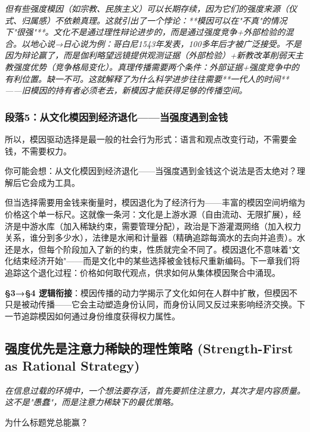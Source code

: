 \documentclass[a4paper,12pt]{book}
\newenvironment{motivation}{\begin{tcolorbox}[colback=gray!10,colframe=gray!60,title=\textit{动机}]\small\itshape}{\end{tcolorbox}}
\newenvironment{questionbox}{\begin{tcolorbox}[colback=red!3,colframe=red!60]}{\end{tcolorbox}}
\begin{document}
\begin{motivation}
\begin{motivation}
\begin{motivation}
但有些强度模因（如宗教、民族主义）可以长期存续，因为它们的强度来源（仪式、归属感）不依赖真理。这就引出了一个悖论：**模因可以在"不真"的情况下"很强"**。文化不是通过理性辩论进步的，而是通过强度竞争+外部检验的混合。以地心说→日心说为例：哥白尼1543年发表，100多年后才被广泛接受。不是因为辩论赢了，而是伽利略望远镜提供观测证据（外部检验）+新教改革削弱天主教强度优势（竞争格局变化）。真理传播需要两个条件：外部证据+强度竞争中的有利位置。缺一不可。这就解释了为什么科学进步往往需要**一代人的时间**——旧模因的持有者必须老去，新模因才能获得足够的传播空间。

	\subsubsection*{段落5：从文化模因到经济退化——当强度遇到金钱}
	所以，模因驱动选择是最一般的社会行为形式：语言和观点改变行动，不需要金钱，不需要权力。
	\begin{tcolorbox}[colback=yellow!5, title=\textit{读者行为预测}]
		你可能会想：从文化模因到经济退化——当强度遇到金钱这个说法是否太绝对？理解后它会成为工具。
	\end{tcolorbox}

但当选择需要用金钱来衡量时，模因退化为了经济行为——丰富的模因空间坍缩为价格这个单一标尺。这就像一条河：文化是上游水源（自由流动、无限扩展），经济是中游水库（加入稀缺约束，需要管理分配），政治是下游灌溉网络（加入权力关系，谁分到多少水），法律是水闸和计量器（精确追踪每滴水的去向并追责）。水还是水，但每个阶段加入了新的约束，性质就完全不同了。模因退化不意味着"文化结束经济开始"——而是文化中的某些选择被金钱标尺重新编码。下一章我们将追踪这个退化过程：价格如何取代观点，供求如何从集体模因聚合中涌现。

	\textbf{§3→§4 逻辑衔接}：模因传播的动力学揭示了文化如何在人群中扩散，但模因不只是被动传播——它会主动塑造身份认同，而身份认同又反过来影响经济交换。下一节追踪模因如何通过身份维度获得权力属性。


	
	\subsection{强度优先是注意力稀缺的理性策略 (Strength-First as Rational Strategy)}
	\begin{motivation}
		在信息过载的环境中，一个想法要存活，首先要抓住注意力，其次才是内容质量。这不是"愚蠢"，而是注意力稀缺下的最优策略。
	\end{motivation}
	\begin{questionbox}
		为什么标题党总能赢？
	\end{questionbox}


\end{motivation}
\end{motivation}
\end{motivation}
\end{document}
